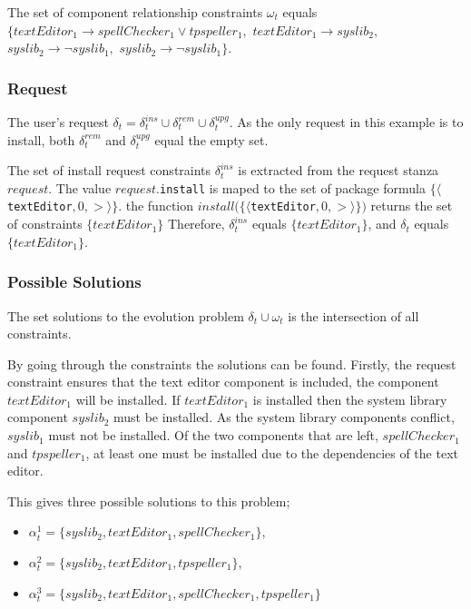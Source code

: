 The set of component relationship constraints $\omega_t$ equals
$\{ textEditor_1 \rightarrow spellChecker_1 \vee tpspeller_1,$ 
$textEditor_1 \rightarrow syslib_2,$ 
$syslib_2 \rightarrow \neg syslib_1,$   
$syslib_2 \rightarrow \neg syslib_1\}$.

\subsubsection{Request}
The user's request $\delta_t =  \delta_t^{ins} \cup \delta_t^{rem} \cup \delta_t^{upg}$.
As the only request in this example is to install, both $\delta_t^{rem}$ and $\delta_t^{upg}$ equal the empty set.

The set of install request constraints $ \delta_t^{ins}$ is extracted from the request stanza $request$.
The value $request$.\texttt{install} is maped to the set of package formula $\{\langle $\verb+textEditor+$,0,>\rangle\}$.
the function $install(\{\langle $\verb+textEditor+$,0,>\rangle\})$ returns the set of constraints $\{textEditor_1\}$
Therefore, $\delta_t^{ins}$ equals $\{textEditor_1\}$, and $\delta_t$ equals $\{textEditor_1\}$.

\subsubsection{Possible Solutions}
The set solutions to the evolution problem $\delta_t \cup \omega_t$ is the intersection of all constraints.

By going through the constraints the solutions can be found.
Firstly, the request constraint ensures that the text editor component is included, the component $textEditor_1$ will be installed.
If $textEditor_1$ is installed then the system library component $syslib_2$ must be installed.
As the system library components conflict, $syslib_1$ must not be installed.
Of the two components that are left, $spellChecker_1$ and $tpspeller_1$, at least one must be installed due to the dependencies of the text editor.

This gives three possible solutions to this problem;
\begin{itemize}
  \item $\alpha_t^1 = \{syslib_2, textEditor_1, spellChecker_1\}$,
  \item $\alpha_t^2 = \{syslib_2, textEditor_1, tpspeller_1\}$,
  \item $\alpha_t^3 = \{syslib_2, textEditor_1, spellChecker_1, tpspeller_1\}$
\end{itemize}

